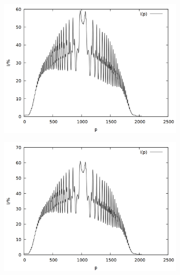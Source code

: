 \begin{figure}[!h]
\begin{subfigure}{0.45\textwidth}
\end{subfigure}
\begin{subfigure}{0.45\textwidth}
\includegraphics[width=\textwidth]{data/zeeman/out_6_6_raw.png}
\end{subfigure}
\begin{subfigure}{0.45\textwidth}
\includegraphics[width=\textwidth]{data/zeeman/out_6_9_raw.png}
\end{subfigure}
\begin{subfigure}{0.45\textwidth}

\end{subfigure}
\end{figure}
